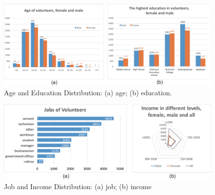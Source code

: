 \documentclass{ieeeaccess}
\begin{document}
\begin{figure}[htb!]
 \centering %
 \includegraphics[width=\columnwidth]{pictures/data1}
 \caption{Age and Education Distribution: (a) age; (b) education.}
 \label{fig:data_age_edu}
\end{figure}


\begin{figure}[htb!]
 \centering %
 \includegraphics[width=\columnwidth]{pictures/data2}
 \caption{Job and Income Distribution: (a) job; (b) income}
 \label{fig:data_job_inc}
\end{figure}
\fi
\end{document}
